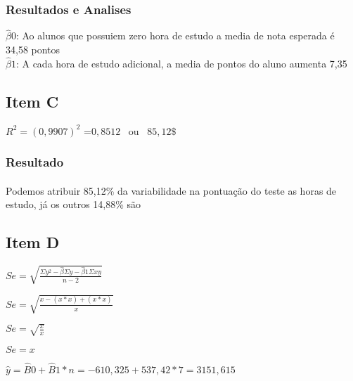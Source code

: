 \documentclass{article}
\begin{document}
            \subsubsection{Resultados e Analises}

            $\hat{\beta}0 $: Ao alunos que possuiem zero hora de estudo
                             a media de nota esperada é 34,58 pontos   \\    
            $\hat{\beta}1 $: A cada hora de estudo adicional, a media de pontos do aluno aumenta 7,35

    \subsection{Item C}
        
            \begin{flushleft}
                $R^2 = (0,9907)^2$ =$0,8512$ \ ou \ $85,12\$$
            \end{flushleft}

            \subsubsection{Resultado}
            \paragraph{}Podemos atribuir 85,12\% da variabilidade na pontuação do teste as horas de estudo, 
            já os outros 14,88\% são 

    \subsection{Item D}
            \begin{flushleft}
            $Se = \sqrt{ \frac{\Sigma y^2 - \hat{\beta } \Sigma y - \hat{\beta}1 \Sigma xy }{n-2}}$
            \end{flushleft}   

            \begin{flushleft}
            $Se = \sqrt{ \frac{x - (x * x)+ (x * x) }{x}}$

            $Se = \sqrt{ \frac{x }{x}}$

            $Se = x$
            \end{flushleft}   

            \begin{flushleft}
            $\hat{y} = \hat{B}0 + \hat{B}1 *n = -610,325 + 537,42 * 7=3151,615$
            \end{flushleft}   
\end{document}
